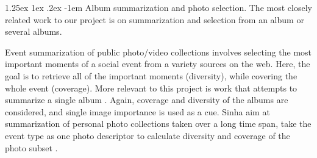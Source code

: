 \documentclass[10pt,twocolumn,letterpaper]{article}
\makeatletter
\renewcommand\paragraph{\@startsection{paragraph}{4}{\z@}%
           {1.25ex \@plus1ex \@minus.2ex}%
           {-1em}%
           {\normalfont\normalsize\bfseries}}
\makeatother
\begin{document}

\paragraph{Album summarization and photo selection.}
The most closely related work to our project is on summarization and selection from an album or several albums.

Event summarization of public photo/video collections involves selecting the most important moments of a social event from a variety sources on the web\cite{social_summarize, scene_summarize}. Here, the goal is to retrieve all of the important moments (diversity), while covering the whole event (coverage). More relevant to this project is work that attempts to summarize a single album \cite{nips_summarize,vacation, sum_pinaki}. Again, coverage and diversity of the albums are considered, and single image importance is used as a cue\cite{vacation, sum_pinaki}. Sinha \etal aim at summarization of personal photo collections taken over a long time span, take the event type as one photo descriptor to calculate diversity and coverage of the photo subset \cite{sum_pinaki}. %
\end{document}
